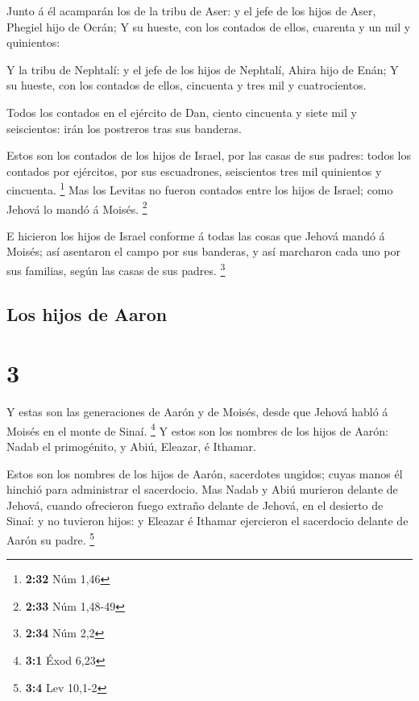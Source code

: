  Junto á él acamparán los de la tribu de Aser: y el jefe de
los hijos de Aser, Phegiel hijo de Ocrán;  Y su hueste, con
los contados de ellos, cuarenta y un mil y quinientos:

 Y la tribu de Nephtalí: y el jefe de los hijos de
Nephtalí, Ahira hijo de Enán;  Y su hueste, con los
contados de ellos, cincuenta y tres mil y cuatrocientos.

 Todos los contados en el ejército de Dan, ciento cincuenta
y siete mil y seiscientos: irán los postreros tras sus banderas.

 Estos son los contados de los hijos de Israel, por las
casas de sus padres: todos los contados por ejércitos, por sus
escuadrones, seiscientos tres mil quinientos y cincuenta. \footnote{\textbf{2:32}
  Núm 1,46}  Mas los Levitas no fueron contados entre los
hijos de Israel; como Jehová lo mandó á Moisés. \footnote{\textbf{2:33}
  Núm 1,48-49}

 E hicieron los hijos de Israel conforme á todas las cosas
que Jehová mandó á Moisés; así asentaron el campo por sus banderas, y
así marcharon cada uno por sus familias, según las casas de sus padres.
\footnote{\textbf{2:34} Núm 2,2}

\hypertarget{los-hijos-de-aaron}{%
\subsection{Los hijos de Aaron}\label{los-hijos-de-aaron}}

\hypertarget{section-2}{%
\section{3}\label{section-2}}

 Y estas son las generaciones de Aarón y de Moisés, desde
que Jehová habló á Moisés en el monte de Sinaí. \footnote{\textbf{3:1}
  Éxod 6,23}  Y estos son los nombres de los hijos de Aarón:
Nadab el primogénito, y Abiú, Eleazar, é Ithamar.

 Estos son los nombres de los hijos de Aarón, sacerdotes
ungidos; cuyas manos él hinchió para administrar el sacerdocio.
 Mas Nadab y Abiú murieron delante de Jehová, cuando
ofrecieron fuego extraño delante de Jehová, en el desierto de Sinaí: y
no tuvieron hijos: y Eleazar é Ithamar ejercieron el sacerdocio delante
de Aarón su padre. \footnote{\textbf{3:4} Lev 10,1-2}


